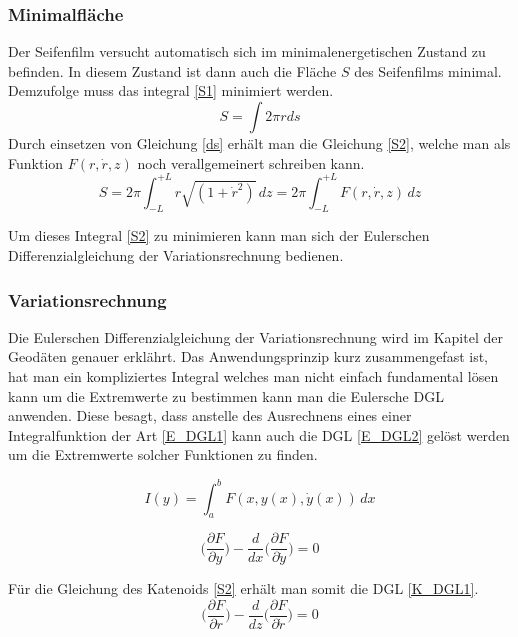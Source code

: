 \begin{refsection}
\subsubsection{Minimalfläche}
Der Seifenfilm versucht automatisch sich im minimalenergetischen Zustand zu befinden. In diesem Zustand ist dann auch die Fläche $S$ des Seifenfilms minimal.
Demzufolge muss das integral \eqref{S1} minimiert werden. 
\begin{equation} \label{S1}  
  S= \int 2 \pi r ds 
\end{equation}
Durch einsetzen von Gleichung \eqref{ds} erhält man die Gleichung \eqref{S2}, welche man als Funktion $F(r,\dot r, z)$ noch verallgemeinert schreiben kann.
\begin{equation} \label{S2}
  S=2 \pi \int_{-L}^{+L} r\sqrt{(1+\dot r^2)}\,dz =2 \pi \int_{-L}^{+L}  F(r,\dot r, z) \,dz 
\end{equation}


Um dieses Integral \eqref{S2} zu minimieren kann man sich der Eulerschen Differenzialgleichung der Variationsrechnung bedienen. 
\subsubsection{Variationsrechnung}
Die Eulerschen Differenzialgleichung der Variationsrechnung wird im Kapitel der Geodäten genauer erklährt.
Das Anwendungsprinzip kurz zusammengefast ist, hat man ein kompliziertes Integral welches man nicht einfach fundamental lösen kann um die Extremwerte zu bestimmen kann man die Eulersche DGL anwenden. Diese besagt, dass anstelle des Ausrechnens eines einer Integralfunktion der Art \eqref{E_DGL1} kann auch die DGL \eqref{E_DGL2} gelöst werden um die Extremwerte solcher Funktionen zu finden.

\begin{equation} \label{E_DGL1}  
  I(y)= \int_a^b F(x,y(x),\dot y(x))\,dx       
\end{equation}

\begin{equation} \label{E_DGL2}
\bigg(\frac{\partial F}{\partial y}\bigg)- \frac{d}{dx} \bigg(\frac{\partial F}{\partial \dot{y}}\bigg)=0         
\end{equation}

Für die Gleichung des Katenoids \eqref{S2} erhält man somit die DGL \eqref{K_DGL1}.
\begin{equation} \label{K_DGL1}
\bigg(\frac{\partial F}{\partial r}\bigg)- \frac{d}{dz} \bigg(\frac{\partial F}{\partial \dot{r}}\bigg)=0    
\end{equation}


\end{refsection}
